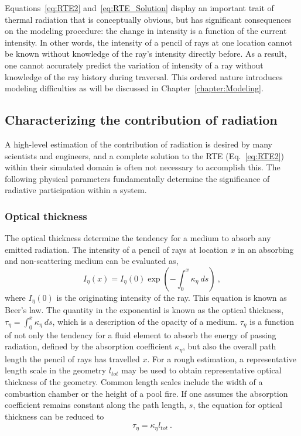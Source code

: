 Equations~\ref{eq:RTE2} and~\ref{eq:RTE_Solution} display an important trait of thermal radiation that is conceptually obvious, but has significant consequences on the modeling procedure:
the change in intensity is a function of the current intensity. In other words, the intensity of a pencil of rays at one location cannot be known without knowledge of the ray's intensity directly before.
As a result, one cannot accurately predict the variation of intensity of a ray without knowledge of the ray history during traversal.
This ordered nature introduces modeling difficulties as will be discussed in Chapter~\ref{chapter:Modeling}.


\subsection{Characterizing the contribution of radiation}
\label{section:CharacterizingRadiation}
A high-level estimation of the contribution of radiation is desired by many scientists and engineers, and a complete solution to the RTE (Eq.~\ref{eq:RTE2}) within their simulated domain is often not necessary to accomplish this. 
The following physical parameters fundamentally determine the significance of radiative participation within a system.

\subsubsection{Optical thickness}
The optical thickness determine the tendency for a medium to absorb any emitted radiation. The intensity of a pencil of rays at location $x$ in an absorbing and non-scattering medium can be evaluated as,
\begin{equation}
    I_\eta{}(x)=I_\eta{}(0)\exp{\left(-\int^{x}_0{\kappa{}_\eta{}~ds}\right)} \ ,
    \label{eq:BeersLaw}
\end{equation}
where $I_\eta{}(0)$ is the originating intensity of the ray. This equation is known as Beer's law. The quantity in the exponential is known as the optical thickness, $\tau{}_\eta{}=\int^{x}_0{\kappa{}_\eta{}~ds}$, which is a description of the opacity of a medium. $\tau{}_\eta{}$ is a function of not only the tendency for a fluid element to absorb the energy of passing radiation, defined by the absorption coefficient $\kappa{}_\eta{}$, but also the overall path length the pencil of rays has travelled $x$. For a rough estimation, a representative length scale in the geometry $l_{tot}$ may be used to obtain representative optical thickness of the geometry. Common length scales include the width of a combustion chamber or the height of a pool fire.
If one assumes the absorption coefficient remains constant along the path length, $s$, the equation for optical thickness can be reduced to
\begin{equation}
    \tau{}_\eta = \kappa{}_\eta{}l_{tot} \ .
    \label{eq:Tau_simple}
\end{equation}

